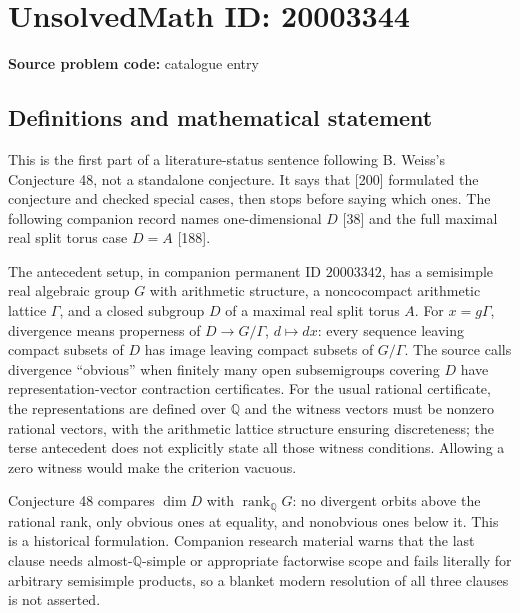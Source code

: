 \documentclass[11pt]{article}
\newcommand{\Q}{\mathbb{Q}}
\begin{document}
\section*{UnsolvedMath ID: 20003344}
\textbf{Source problem code:} catalogue entry
\subsection{Definitions and mathematical statement}
This is the first part of a literature-status sentence following B. Weiss's Conjecture 48, not a standalone conjecture. It says that [200] formulated the conjecture and checked special cases, then stops before saying which ones. The following companion record names one-dimensional $D$ [38] and the full maximal real split torus case $D=A$ [188].

The antecedent setup, in companion permanent ID $20003342$, has a semisimple real algebraic group $G$ with arithmetic structure, a noncocompact arithmetic lattice $\Gamma$, and a closed subgroup $D$ of a maximal real split torus $A$. For $x=g\Gamma$, divergence means properness of $D\to G/\Gamma$, $d\mapsto dx$: every sequence leaving compact subsets of $D$ has image leaving compact subsets of $G/\Gamma$. The source calls divergence ``obvious'' when finitely many open subsemigroups covering $D$ have representation-vector contraction certificates. For the usual rational certificate, the representations are defined over $\Q$ and the witness vectors must be nonzero rational vectors, with the arithmetic lattice structure ensuring discreteness; the terse antecedent does not explicitly state all those witness conditions. Allowing a zero witness would make the criterion vacuous.

Conjecture 48 compares $\dim D$ with $\operatorname{rank}_{\Q}G$: no divergent orbits above the rational rank, only obvious ones at equality, and nonobvious ones below it. This is a historical formulation. Companion research material warns that the last clause needs almost-$\Q$-simple or appropriate factorwise scope and fails literally for arbitrary semisimple products, so a blanket modern resolution of all three clauses is not asserted.
\end{document}
